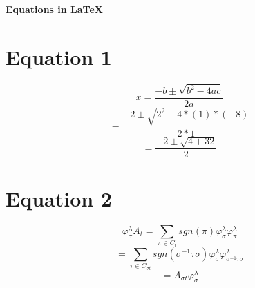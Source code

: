 \documentclass[10pt,a4paper]{article}
\begin{document}
\begin{center}
\Large{\textbf{Equations in \LaTeX}}
\end{center}
\section*{Equation 1}
\begin{fleqn}
\[
x = \frac{-b \pm \sqrt{b^{2}-4ac}}{2a}
\]
\[
= \frac{-2 \pm \sqrt{2^{2}-4*(1)*(-8)}}{2*1}
\]
\[
= \frac{-2 \pm \sqrt{4+32}}{2}
\]
\end{fleqn}
\section*{Equation 2}
\begin{fleqn}
\[
\varphi^{\lambda}_{\sigma}A_{t} = \sum_{\pi \in C_{t}} 
sgn(\pi)\varphi^{\lambda}_{\sigma}\varphi^{\lambda}_{\pi}
\]
\[
= \sum_{\tau \in C_{\sigma t}} sgn(\sigma^{-
1}\tau\sigma)\varphi^{\lambda}_{\sigma}\varphi^{\lambda}_{\sigma^{-1}\tau\sigma}
\]
\[
= A_{\sigma t} \varphi^{\lambda}_{\sigma}
\]
\end{fleqn}
\end{document}
